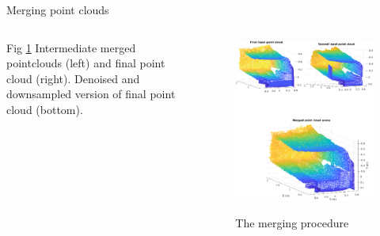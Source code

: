 \documentclass{beamer}
\begin{document}

\begin{frame}{Merging point clouds}

\begin{columns}
	\begin{column}{0.5\textwidth}
				\begin{center}
Fig \ref{merge}   Intermediate merged pointclouds (left) and final point cloud (right). Denoised and downsampled version of final point cloud (bottom).
		\end{center}
	\end{column}
	\begin{column}{0.8\textwidth}  %
		\begin{center}
			\begin{figure}
					\includegraphics[width=0.6\linewidth]{Figures/merge_h.eps}
				\label{merge}
				\caption{The merging procedure}
			\end{figure}

		\end{center}
	\end{column}
\end{columns}


\end{frame}
\end{document}
